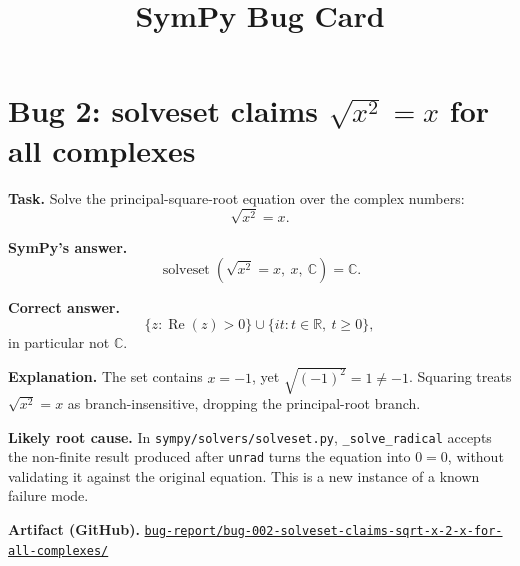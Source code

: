 \documentclass[11pt]{article}
\title{SymPy Bug Card}
\author{}
\date{}
\newcommand{\artifactrepo}{https://github.com/TODO-org/TODO-repo}
\newcommand{\bugbundle}[1]{\href{\artifactrepo/tree/main/bug-report/#1}{\nolinkurl{bug-report/#1/}}}
\begin{document}
\maketitle

\section*{Bug 2: solveset claims \texorpdfstring{$\sqrt{x^2}=x$}{sqrt(x**2) = x} for all complexes}

\begin{counterexamplebox}
\textbf{Task.} Solve the principal-square-root equation over the complex numbers:
\[
    \sqrt{x^2}=x.
\]

\medskip
\textbf{SymPy's answer.}
\[
    \operatorname{solveset}(\sqrt{x^2}=x,\ x,\ \mathbb{C})=\mathbb{C}.
\]

\medskip
\textbf{Correct answer.}
\[
    \{z:\operatorname{Re}(z)>0\}\cup\{it:t\in\mathbb{R},\ t\ge 0\},
\]
in particular not \(\mathbb{C}\).

\medskip
\textbf{Explanation.} The set contains \(x=-1\), yet \(\sqrt{(-1)^2}=1\ne -1\). Squaring treats \(\sqrt{x^2}=x\) as branch-insensitive, dropping the principal-root branch.

\medskip
\textbf{Likely root cause.} In \nolinkurl{sympy/solvers/solveset.py}, \texttt{\_solve\_radical} accepts the non-finite result produced after \texttt{unrad} turns the equation into \(0=0\), without validating it against the original equation. This is a new instance of a known failure mode.

\medskip
\textbf{Artifact (GitHub).} \bugbundle{bug-002-solveset-claims-sqrt-x-2-x-for-all-complexes}
\end{counterexamplebox}
\end{document}
